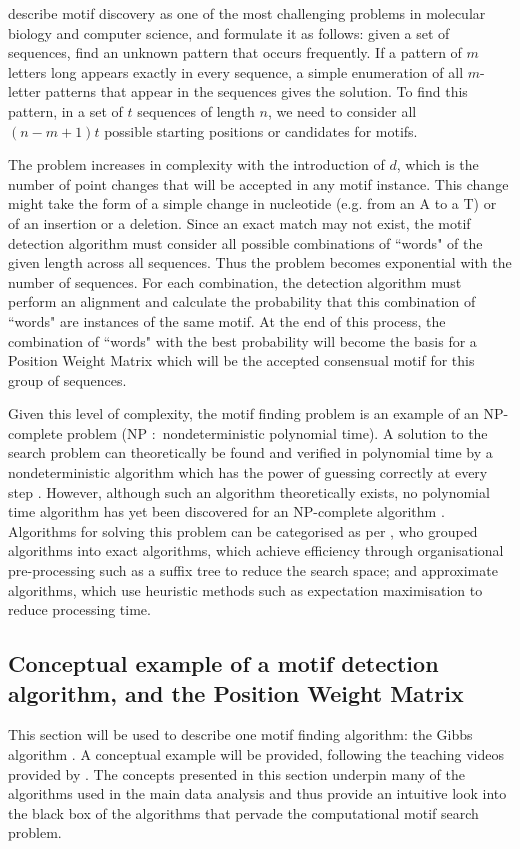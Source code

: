 \documentclass[12pt]{article}
\begin{document}
\citet{das2007survey} describe motif discovery as one of the most challenging problems in molecular biology and computer science, and formulate it as follows:
given a set of sequences, find an unknown pattern that occurs frequently. If a pattern of $m$ letters long appears exactly in every sequence, a simple enumeration of all $m$-letter patterns that appear in the sequences gives the solution. To find this pattern, in a set of $t$ sequences of length $n$, we need to consider all $(n - m +1)t$ possible starting positions or candidates for motifs. 

The problem increases in complexity with the introduction of $d$, which is the number of point changes that will be accepted in any motif instance. This change might take the form of a simple change in nucleotide (e.g. from an A to a T) or of an insertion or a deletion. Since an exact match may not exist, the motif detection algorithm must consider all possible combinations of ``words" of the given length across all sequences. Thus the problem becomes exponential with the number of sequences. For each combination, the detection algorithm must perform an alignment and calculate the probability that this combination of ``words" are instances of the same motif. At the end of this process, the combination of ``words" with the best probability will become the basis for a Position Weight Matrix which will be the accepted consensual motif for this group of sequences. 

Given this level of complexity, the motif finding problem is an example of an NP-complete problem \citep{tran2014survey} (NP $:$ nondeterministic polynomial time). A solution to the search problem can theoretically be found and verified in polynomial time by a nondeterministic algorithm which has the power of guessing correctly at every step \citep{dasgupta2006algorithms}. However, although such an algorithm theoretically exists, no polynomial time algorithm has yet been discovered for an NP-complete algorithm \citep{cormen2009introduction}.  Algorithms for solving this problem can be categorised as per \citep{sun2015affinity}, who grouped algorithms into exact algorithms, which achieve efficiency through organisational pre-processing such as a suffix tree to reduce the search space; and approximate algorithms, which use heuristic methods such as expectation maximisation to reduce processing time.

\subsection{Conceptual example of a motif detection algorithm, and the Position Weight Matrix}
This section will be used to describe one motif finding algorithm: the Gibbs algorithm \citep{Lawrence1993Gibbs}. A conceptual example will be provided, following the teaching videos provided by \citep{Algoshareify}. The concepts presented in this section underpin many of the algorithms
used in the main data analysis and thus provide an intuitive look into the black box of the algorithms that pervade the computational motif search problem. 
\end{document}
